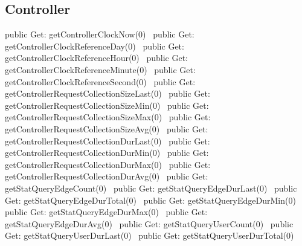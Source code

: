 \subsection{Controller}
\nwenddocs{}\plusendmoddef
public \LA{}Get: getControllerClockNow(0)~{\nwtagstyle{}}\RA{}
public \LA{}Get: getControllerClockReferenceDay(0)~{\nwtagstyle{}}\RA{}
public \LA{}Get: getControllerClockReferenceHour(0)~{\nwtagstyle{}}\RA{}
public \LA{}Get: getControllerClockReferenceMinute(0)~{\nwtagstyle{}}\RA{}
public \LA{}Get: getControllerClockReferenceSecond(0)~{\nwtagstyle{}}\RA{}
public \LA{}Get: getControllerRequestCollectionSizeLast(0)~{\nwtagstyle{}}\RA{}
public \LA{}Get: getControllerRequestCollectionSizeMin(0)~{\nwtagstyle{}}\RA{}
public \LA{}Get: getControllerRequestCollectionSizeMax(0)~{\nwtagstyle{}}\RA{}
public \LA{}Get: getControllerRequestCollectionSizeAvg(0)~{\nwtagstyle{}}\RA{}
public \LA{}Get: getControllerRequestCollectionDurLast(0)~{\nwtagstyle{}}\RA{}
public \LA{}Get: getControllerRequestCollectionDurMin(0)~{\nwtagstyle{}}\RA{}
public \LA{}Get: getControllerRequestCollectionDurMax(0)~{\nwtagstyle{}}\RA{}
public \LA{}Get: getControllerRequestCollectionDurAvg(0)~{\nwtagstyle{}}\RA{}
public \LA{}Get: getStatQueryEdgeCount(0)~{\nwtagstyle{}}\RA{}
public \LA{}Get: getStatQueryEdgeDurLast(0)~{\nwtagstyle{}}\RA{}
public \LA{}Get: getStatQueryEdgeDurTotal(0)~{\nwtagstyle{}}\RA{}
public \LA{}Get: getStatQueryEdgeDurMin(0)~{\nwtagstyle{}}\RA{}
public \LA{}Get: getStatQueryEdgeDurMax(0)~{\nwtagstyle{}}\RA{}
public \LA{}Get: getStatQueryEdgeDurAvg(0)~{\nwtagstyle{}}\RA{}
public \LA{}Get: getStatQueryUserCount(0)~{\nwtagstyle{}}\RA{}
public \LA{}Get: getStatQueryUserDurLast(0)~{\nwtagstyle{}}\RA{}
public \LA{}Get: getStatQueryUserDurTotal(0)~{\nwtagstyle{}}\RA{}
